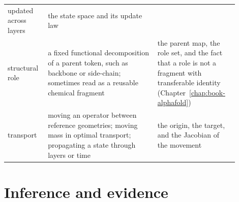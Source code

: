 \begin{center}
\begin{tabular}{@{}>{\raggedright\arraybackslash}p{0.14\linewidth}
                >{\raggedright\arraybackslash}p{0.44\linewidth}
                >{\raggedright\arraybackslash}p{0.32\linewidth}@{}}
updated across layers &
the state space and its update law \\
structural role & a fixed functional decomposition of a parent token, such as backbone or
side-chain; sometimes read as a reusable chemical fragment &
the parent map, the role set, and the fact that a role is not a fragment with transferable
identity (Chapter~\ref{chap:book-alphafold}) \\
transport & moving an operator between reference geometries; moving mass in optimal transport;
propagating a state through layers or time &
the origin, the target, and the Jacobian of the movement \\
\bottomrule
\end{tabular}
\end{center}

\section*{Inference and evidence}

